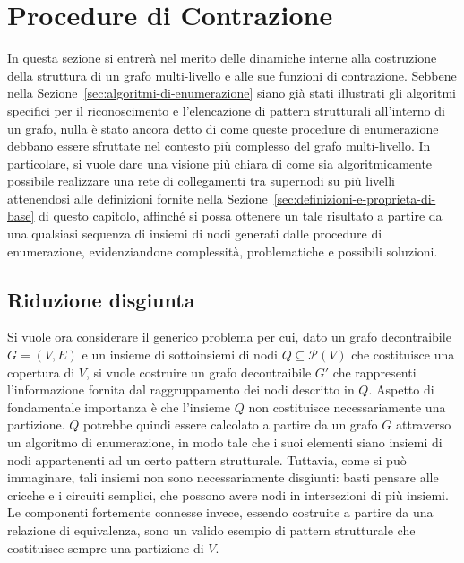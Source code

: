 \section{Procedure di Contrazione}\label{cap:procedure-contrazione}

In questa sezione si entrerà nel merito delle dinamiche interne alla costruzione della struttura di un grafo
multi-livello e alle sue funzioni di contrazione.
Sebbene nella Sezione~\ref{sec:algoritmi-di-enumerazione} siano già stati illustrati gli
algoritmi specifici per il riconoscimento e l'elencazione di pattern strutturali all'interno di un grafo,
nulla è stato ancora detto di come queste procedure di enumerazione debbano essere sfruttate nel contesto più
complesso del grafo multi-livello.
In particolare, si vuole dare una visione più chiara di come sia algoritmicamente
possibile realizzare una rete di collegamenti tra supernodi su più livelli attenendosi alle definizioni
fornite nella Sezione~\ref{sec:definizioni-e-proprieta-di-base} di questo capitolo, affinché si possa ottenere un tale
risultato a partire da una qualsiasi sequenza di insiemi di nodi generati dalle procedure di enumerazione,
evidenziandone complessità, problematiche e possibili soluzioni.

\subsection{Riduzione disgiunta}

Si vuole ora considerare il generico problema per cui, dato un grafo decontraibile $G = (V, E)$ e un insieme di
sottoinsiemi di nodi $Q \subseteq \mathcal{P}(V)$ che costituisce una copertura di $V$, si vuole costruire un grafo
decontraibile $G'$ che rappresenti l'informazione fornita dal raggruppamento dei nodi descritto in $Q$.
Aspetto di fondamentale importanza è che l'insieme $Q$ non costituisce necessariamente una partizione.
$Q$ potrebbe quindi essere calcolato a partire da un grafo $G$ attraverso un algoritmo di enumerazione, in modo tale
che i suoi elementi siano insiemi di nodi appartenenti ad un certo pattern strutturale.
Tuttavia, come si può immaginare, tali insiemi non sono necessariamente disgiunti: basti pensare alle cricche e i
circuiti semplici, che possono avere nodi in intersezioni di più insiemi.
Le componenti fortemente connesse invece, essendo costruite a partire da una relazione di equivalenza, sono un
valido esempio di pattern strutturale che costituisce sempre una partizione di $V$. \newline

